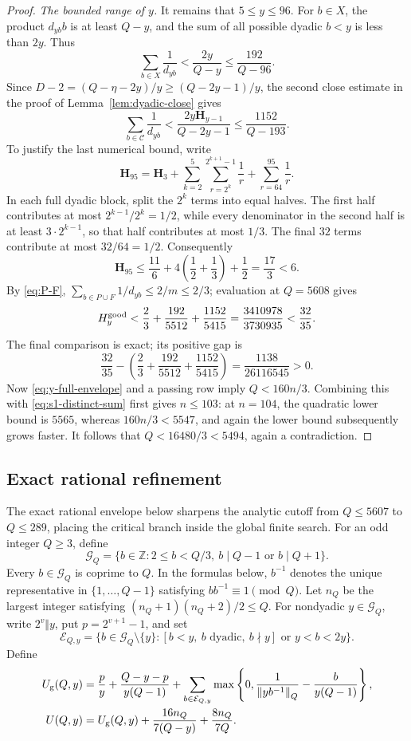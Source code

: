 \documentclass[11pt]{article}
\theoremstyle{definition}
\theoremstyle{remark}
\newcommand{\Z}{\mathbb Z}
\newcommand{\normQ}[1]{\left\lVert #1\right\rVert_Q}
\newcommand{\Harm}{\mathbf H}
\begin{document}
\begin{proof}
\smallskip
\noindent\emph{The bounded range of \(y\).}
It remains that \(5\le y\le96\).  For \(b\in X\), the product
\(d_{yb}b\) is at least \(Q-y\), and the sum of all possible dyadic
\(b<y\) is less than \(2y\).  Thus
\[
 \sum_{b\in X}\frac1{d_{yb}}
 <\frac{2y}{Q-y}\le\frac{192}{Q-96}.
\]
Since
\(D-2=(Q-\eta-2y)/y\ge(Q-2y-1)/y\), the second close estimate in the
proof of Lemma~\ref{lem:dyadic-close} gives
\[
 \sum_{b\in\mathcal C}\frac1{d_{yb}}
 <\frac{2y\Harm_{y-1}}{Q-2y-1}
 \le\frac{1152}{Q-193}.
\]
To justify the last numerical bound, write
\[
 \Harm_{95}
 =\Harm_3+
  \sum_{k=2}^{5}\sum_{r=2^k}^{2^{k+1}-1}\frac1r
  +\sum_{r=64}^{95}\frac1r.
\]
In each full dyadic block, split the \(2^k\) terms into equal halves.  The
first half contributes at most \(2^{k-1}/2^k=1/2\), while every denominator
in the second half is at least \(3\cdot2^{k-1}\), so that half contributes
at most \(1/3\).  The final \(32\) terms contribute at most \(32/64=1/2\).
Consequently
\[
 \Harm_{95}
 \le\frac{11}{6}+4\left(\frac12+\frac13\right)+\frac12
 =\frac{17}{3}<6.
\]
By \eqref{eq:P-F},
\(\sum_{b\in P\cup F}1/d_{yb}\le2/m\le2/3\); evaluation at
\(Q=5608\) gives
\[
 H_y^{\rm good}
 <\frac23+\frac{192}{5512}+\frac{1152}{5415}
 =\frac{3410978}{3730935}<\frac{32}{35}.
\]
The final comparison is exact; its positive gap is
\[
 \frac{32}{35}-
 \left(\frac23+\frac{192}{5512}+\frac{1152}{5415}\right)
 =\frac{1138}{26116545}>0.
\]
Now \eqref{eq:y-full-envelope} and a passing row imply
\(Q<160n/3\).  Combining this with \eqref{eq:s1-distinct-sum} first
gives \(n\le103\): at \(n=104\), the quadratic lower bound is \(5565\),
whereas \(160n/3<5547\), and again the lower bound subsequently grows
faster.  It follows that
\(Q<16480/3<5494\), again a contradiction.
\end{proof}

\subsection{Exact rational refinement}

The exact rational envelope below sharpens the analytic cutoff from
\(Q\le5607\) to \(Q\le289\), placing the critical branch inside the global
finite search.
For an odd integer \(Q\ge3\), define
\[
 \mathcal G_Q=\{b\in\Z:2\le b<Q/3,\ b\mid Q-1\text{ or }b\mid Q+1\}.
\]
Every \(b\in\mathcal G_Q\) is coprime to \(Q\).  In the formulas below,
\(b^{-1}\) denotes the unique representative in \(\{1,\ldots,Q-1\}\)
satisfying \(bb^{-1}\equiv1\pmod Q\).
Let \(n_Q\) be the largest integer satisfying
\((n_Q+1)(n_Q+2)/2\le Q\).  For nondyadic \(y\in\mathcal G_Q\), write
\(2^v\Vert y\), put \(p=2^{v+1}-1\), and set
\[
 \mathcal E_{Q,y}=\{b\in\mathcal G_Q\setminus\{y\}:
 [b<y,\ b\text{ dyadic},\ b\nmid y]\text{ or }y<b<2y\}.
\]
Define
\begin{align}
 U_{\rm g}(Q,y)
 &=\frac py+\frac{Q-y-p}{y(Q-1)}
 +\sum_{b\in\mathcal E_{Q,y}}
 \max\left\{0,\frac1{\normQ{yb^{-1}}}
 -\frac{b}{y(Q-1)}\right\},\label{eq:Ug}\\
 U(Q,y)&=U_{\rm g}(Q,y)
 +\frac{16n_Q}{7(Q-y)}+\frac{8n_Q}{7Q}.
 \label{eq:U-total}
\end{align}
\end{document}
